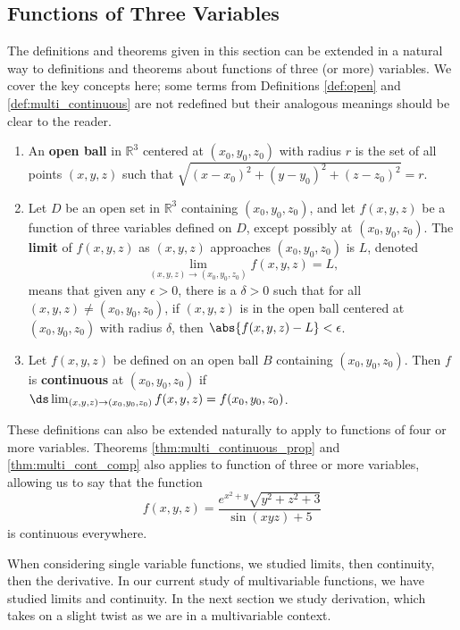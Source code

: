 \subsection{Functions of Three Variables}

The definitions and theorems given in this section can be extended in a natural way to definitions and theorems about functions of three (or more) variables. We cover the key concepts here; some terms from Definitions \ref{def:open} and \ref{def:multi_continuous} are not redefined but their analogous meanings should be clear to the reader.

\setboxwidth{20pt}
{%
\begin{enumerate}
\item An \textbf{open ball} in $\mathbb{R}^3$ centered at $(x_0,y_0,z_0)$ with radius $r$ is the set of all points $(x,y,z)$ such that $\sqrt{(x-x_0)^2+(y-y_0)^2+(z-z_0)^2} = r$.\bigskip
\item Let $D$ be an open set in $\mathbb{R}^3$ containing $(x_0,y_0,z_0)$, and let $f(x,y,z)$ be a function of three variables defined on $D$, except possibly at  $(x_0,y_0,z_0)$. The \textbf{limit} of $f(x,y,z)$ as $(x,y,z)$ approaches $(x_0,y_0,z_0)$ is $L$, denoted 
\[\lim_{(x,y,z)\to (x_0,y_0,z_0)} f(x,y,z) = L,\]
means that given any $\epsilon >0$, there is a $\delta >0$ such that for all  $(x,y,z)\neq(x_0,y_0,z_0)$, if $(x,y,z)$ is in the open ball centered at $(x_0,y_0,z_0)$ with radius $\delta$, then $\abs{f(x,y,z) - L}< \epsilon$.\bigskip
\item Let $f(x,y,z)$ be defined on an open ball $B$ containing $(x_0,y_0,z_0)$. Then $f$ is \textbf{continuous} at $(x_0,y_0,z_0)$ if $\ds \lim_{(x,y,z)\to (x_0,y_0,z_0)} f(x,y,z) = f(x_0,y_0,z_0)$.
\end{enumerate}}

These definitions can also be extended naturally to apply to functions of four or more variables. Theorems \ref{thm:multi_continuous_prop} and \ref{thm:multi_cont_comp} also applies to function of three or more variables, allowing us to say that the function
\[f(x,y,z) = \frac{e^{x^2+y}\sqrt{y^2+z^2+3}}{\sin (xyz)+5}\]
is continuous everywhere.

When considering single variable functions, we studied limits, then continuity, then the derivative. In our current study of multivariable functions, we have studied limits and continuity. In the next section we study derivation, which takes on a slight twist as we are in a multivariable context.

